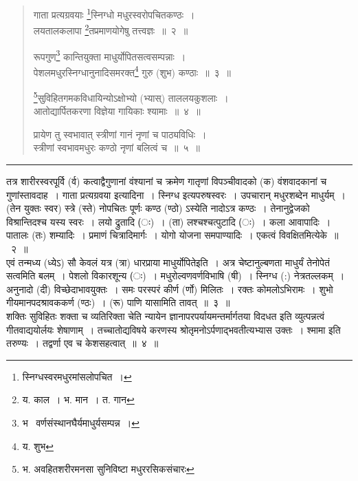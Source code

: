 \documentclass[11pt, openany]{book}
\begin{document}
\begin{quote}
{\na गाता प्रत्यग्रवयाः \renewcommand{\thefootnote}{1}\footnote{स्निग्धस्वरमधुरमांसलोपचित~।}स्निग्धो मधुरस्वरोपचितकण्ठः~।\\
 लयतालकलापा \renewcommand{\thefootnote}{2}\footnote{य. काल~। भ. मान~। त. गान}तप्रमाणयोगेषु तत्त्वज्ञः~॥~२~॥

 रूपगुण\renewcommand{\thefootnote}{3}\footnote{भ \textendash\ वर्णसंस्थानघैर्यमाधुर्यसम्पन्न~।} कान्तियुक्ता माधुर्योपितसत्वसम्पन्नाः~।\\
 पेशलमधुरस्निग्धानुनादिसमरक्त\renewcommand{\thefootnote}{4}\footnote{य. शुभ} गुरु (शुभ) कण्ठाः~॥~३~॥

 \renewcommand{\thefootnote}{5}\footnote{भ. अवहितशरीरमनसा सुनिविष्टा मधुररसिकसंचारः}सुविहितगमकविधायिन्योऽक्षोभ्यो (भ्यास्) ताललयकुशलाः~।\\
 आतोद्यार्पितकरणा विज्ञेया गायिकाः श्यामाः~॥~४~॥

 प्रायेण तु स्वभावात् स्त्रीणां गानं नृणां च पाठ्यविधिः~।\\
 स्त्रीणां स्वभावमधुरः कण्ठो नृणां बलित्वं च~॥~५~॥}
\end{quote}

\hrule

\vspace{2mm}
तत्र शारीरस्वरपूर्वि (र्व) कत्वाद्वैगुणानां वंश्यानां च क्रमेण गातृणां विपञ्चीवादको (क) वंशवादकानां च गुणांस्तावदाह~। {\qtt गाता प्रत्यग्रवया} इत्यादिना~। {\qtt स्निग्ध} इत्यपरुषस्वरः~। {\qtt उपचारान् मधुरशब्देन} माधुर्यम्~।  (तेन युक्तः स्वर) स्त्रे (स्ते) नोपचितः पूर्णः कण्ठ  (ण्ठो) ऽस्येति नादोऽत्र कण्ठः~। तेनानुद्वेजको विश्रान्तिदश्च यस्य स्वरः~। लयो द्रुतादि (ः)~। (ता) लश्चश्चत्पुटादि (ः)~। कला आवापादिः~। पातालः (तः) शम्यादिः~। प्रमाणं चित्रादिमार्गः~। योगो योजना समपाण्यादिः~। एकत्वं विवक्षितमित्येके~॥~२~॥\\

एवं तन्मध्य (ध्येऽ) सौ केवलं यत्र (त्रा) धारप्राया माधुर्योपितेइति~। अत्र चेष्टानुल्बणता माधुर्यं तेनोपेतं सत्वमिति बलम्~। {\qtt पेशलो विकार}शून्य (ः)~। मधुरोल्वणवर्णविभाषि (षी)~। {\qtt स्निग्ध} (:) नेत्रतल्लकम्~। {\qtt अनुनादो} (दी) विच्छेदाभावयुक्तः~। समः परस्परं कीर्ण (र्णो) मिलितः~। {\qtt रक्तः} कोमलोऽभिरामः~। शुभो  गीयमानपदश्रावककर्ण (ण्ठः)~। (रू) पाणि यासामिति तावत्~॥~३~॥\\

शक्तिः सुविहितः शक्ता च व्यतिरिक्ता चेति न्यायेन ज्ञानापरपर्यायमन्तर्मार्गतया विदधत इति व्युत्पन्नत्वं गीतवाद्ययोर्लयः शेषाणाम्~। तच्चातोद्यविषये करणस्य श्रोतृमनोऽर्पणाद्भवतीत्यभ्यास उक्तः~। {\qtt श्मामा} इति तरुण्यः~। तद्वर्णा एव च केशसहत्वात्~॥~४~॥\\
\end{document}

